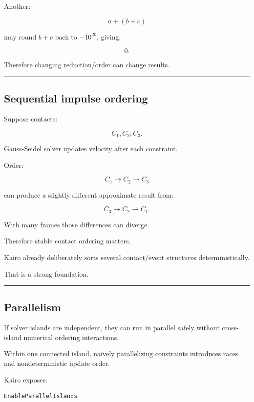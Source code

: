 Another:

\[
a+(b+c)
\]

may round \(b+c\) back to \(-10^{20}\), giving:

\[
0.
\]

Therefore changing reduction/order can change results.

\begin{center}\rule{0.5\linewidth}{0.5pt}\end{center}

\subsection{Sequential impulse ordering}\label{06-engine-ii-ch039-sequential-impulse-ordering}

Suppose contacts:

\[
C_1,C_2,C_3.
\]

Gauss-Seidel solver updates velocity after each constraint.

Order:

\[
C_1\rightarrow C_2\rightarrow C_3
\]

can produce a slightly different approximate result from:

\[
C_3\rightarrow C_2\rightarrow C_1.
\]

With many frames those differences can diverge.

Therefore stable contact ordering matters.

Kairo already deliberately sorts several contact/event structures deterministically.

That is a strong foundation.

\begin{center}\rule{0.5\linewidth}{0.5pt}\end{center}

\subsection{Parallelism}\label{06-engine-ii-ch039-parallelism}

If solver islands are independent, they can run in parallel safely without cross-island numerical ordering interactions.

Within one connected island, naïvely parallelizing constraints introduces races and nondeterministic update order.

Kairo exposes:

\begin{verbatim}
EnableParallelIslands
\end{verbatim}

